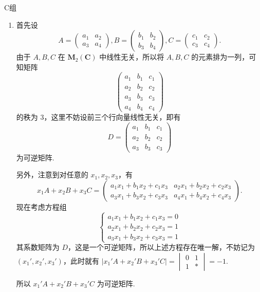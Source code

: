 \centerline{\heiti C组}
\begin{enumerate}
    \item 首先设
          \[A=\begin{pmatrix}a_1 & a_2 \\ a_3 & a_4\end{pmatrix},B=\begin{pmatrix}b_1 & b_2 \\ b_3 & b_4\end{pmatrix},C=\begin{pmatrix}c_1 & c_2 \\ c_3 & c_4\end{pmatrix}.\]
          由于 $A,B,C$ 在 $\mathbf{M}_2(\mathbf{C})$ 中线性无关，所以将 $A,B,C$ 的元素排为一列，可知矩阵
          \[\begin{pmatrix}a_1 & b_1 & c_1 \\ a_2 & b_2 & c_2 \\ a_3 & b_3 & c_3 \\ a_4 & b_4 & c_4\end{pmatrix}\]
          的秩为 3，这里不妨设前三个行向量线性无关，即有
          \[D=\begin{pmatrix}a_1 & b_1 & c_1 \\ a_2 & b_2 & c_2 \\ a_3 & b_3 & c_3\end{pmatrix}\]
          为可逆矩阵.

          另外，注意到对任意的 $x_1,x_2,x_3$，有
          \[x_1A+x_2B+x_3C=\begin{pmatrix}a_1x_1+b_1x_2+c_1x_3 & a_2x_1+b_2x_2+c_2x_3 \\ a_3x_1+b_3x_2+c_3x_3 & a_4x_1+b_4x_2+c_4x_3\end{pmatrix}.\]
          现在考虑方程组
          \[\begin{cases}a_1x_1+b_1x_2+c_1x_3 = 0 \\ a_2x_1+b_2x_2+c_2x_3 = 1 \\ a_3x_1+b_3x_2+c_3x_3 = 1\end{cases}\]
          其系数矩阵为 $D$，这是一个可逆矩阵，所以上述方程存在唯一解，不妨记为 $(x_1',x_2',x_3')$，此时就有 $\lvert x_1'A+x_2'B+x_3'C \rvert = \begin{vmatrix}0 & 1 \\ 1 & \ast\end{vmatrix} = -1$.

          所以 $x_1'A+x_2'B+x_3'C$ 为可逆矩阵.
\end{enumerate}

\clearpage
